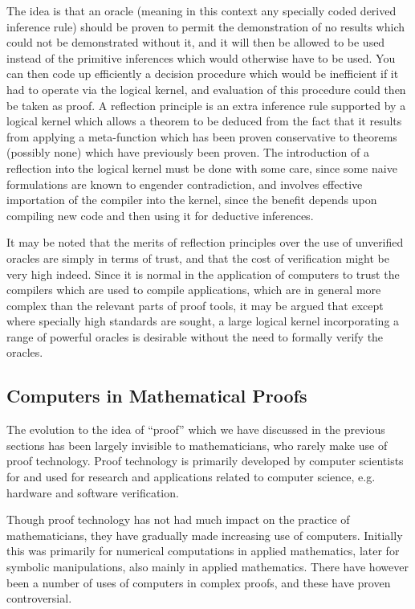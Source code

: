 The idea is that an oracle (meaning in this context any specially coded derived inference rule) should be proven to permit the demonstration of no results which could not be demonstrated without it, and it will then be allowed to be used instead of the primitive inferences which would otherwise have to be used.
You can then code up efficiently a decision procedure which would be inefficient if it had to operate via the logical kernel, and evaluation of this procedure could then be taken as proof.
A reflection principle is an extra inference rule supported by a logical kernel which allows a theorem to be deduced from the fact that it results from applying a meta-function which has been proven conservative to theorems (possibly none) which have previously been proven.
The introduction of a reflection into the logical kernel must be done with some care, since some naive formulations are known to engender contradiction, and involves effective importation of the compiler into the kernel, since the benefit depends upon compiling new code and then using it for deductive inferences. 

It may be noted that the merits of reflection principles over the use of unverified oracles are simply in terms of trust, and that the cost of verification might be very high indeed.
Since it is normal in the application of computers to trust the compilers which are used to compile applications, which are in general more complex than the relevant parts of proof tools, it may be argued that except where specially high standards are sought, a large logical kernel incorporating a range of powerful oracles is desirable without the need to formally verify the oracles.

\subsection{Computers in Mathematical Proofs}

The evolution to the idea of ``proof'' which we have discussed in the previous sections has been largely invisible to mathematicians, who rarely make use of proof technology.
Proof technology is primarily developed by computer scientists for and used for research and applications related to computer science, e.g. hardware and software verification.

Though proof technology has not had much impact on the practice of mathematicians, they have gradually made increasing use of computers.
Initially this was primarily for numerical computations in applied mathematics, later for symbolic manipulations, also mainly in applied mathematics.
There have however been a number of uses of computers in complex proofs, and these have proven controversial.

